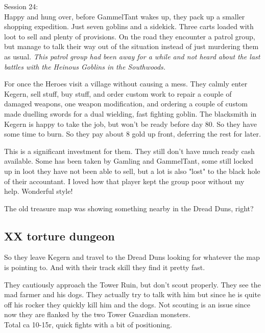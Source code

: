 \noindent Session 24:\\                                                 %
Happy and hung over, before GammelTant wakes up, they pack up a smaller shopping expedition. Just seven goblins and a sidekick. Three carts loaded with loot to sell and plenty of provisions. On the road they encounter a patrol group, but manage to talk their way out of the situation instead of just murdering them as usual. \emph{This patrol group had been away for a while and not heard about the last battles with the Heinous Goblins in the Southwoods.}

For once the Heroes visit a village without causing a mess. They calmly enter Kegern, sell stuff, buy stuff, and order custom work to repair a couple of damaged weapons, one weapon modification, and ordering a couple of custom made duelling swords for a dual wielding, fast fighting goblin. The blacksmith in Kegern is happy to take the job, but won't be ready before day 80. So they have some time to burn. So they pay about 8 gold up front, deferring the rest for later. 

\begin{readoutloud}
This is a significant investment for them. They still don't have much ready cash available. Some has been taken by Gamling and GammelTant, some still locked up in loot they have not been able to sell, but a lot is also "lost" to the black hole of their accountant. I loved how that player kept the group poor without my help. Wonderful style!
\end{readoutloud}

The old treasure map was showing something nearby in the Dread Duns, right?


\subsection*{XX torture dungeon}

So they leave Kegern and travel to the Dread Duns looking for whatever the map is pointing to. And with their track skill they find it pretty fast.

They cautiously approach the Tower Ruin, but don't scout properly. They see the mad farmer and his dogs. They actually try to talk with him but since he is quite off his rocker they quickly kill him and the dogs. Not scouting is an issue since now they are flanked by the two Tower Guardian monsters. \\
Total ca 10-15r, quick fights with a bit of positioning. 

